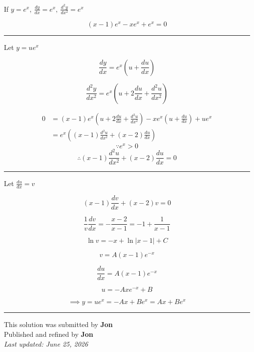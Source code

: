 \documentclass[12pt]{article}
\begin{document}
\newcommand{\ds}{\displaystyle}

If $\ds y=e^x,\ \frac{dy}{dx}=e^x,\  \frac{d^2y}{dx^2}=e^x$

$$(x-1)e^x-xe^x+e^x=0$$

\bigskip\hrule\bigskip

Let $\ds y=ue^x$

$$\frac{dy}{dx}=e^x\left(u+\frac{du}{dx}\right)$$

$$\frac{d^2y}{dx^2}=e^x\left(u+2\frac{du}{dx}+\frac{d^2u}{dx^2}\right)$$

\begin{align*}
0&=(x-1)e^x\left(u+2\frac{du}{dx}+\frac{d^2u}{dx^2}\right)
-xe^x\left(u+\frac{du}{dx}\right)+ue^x\\
&=e^x\left((x-1)\frac{d^2u}{dx^2}+(x-2)\frac{du}{dx}\right)
\end{align*}
$$\because e^x>0$$
$$\therefore (x-1)\frac{d^2u}{dx^2}+(x-2)\frac{du}{dx}=0$$

\bigskip\hrule\bigskip

Let $\ds \frac{du}{dx}=v$

$$(x-1)\frac{dv}{dx}+(x-2)v=0$$

$$\frac1v\frac{dv}{dx}=-\frac{x-2}{x-1}=-1+\frac1{x-1}$$

$$\ln v=-x+\ln|x-1|+C$$

$$v=A(x-1)e^{-x}$$

$$\frac{du}{dx}=A(x-1)e^{-x}$$

$$u=-Axe^{-x}+B$$

$$\implies y=ue^x=-Ax+Be^x=Ax+Be^x$$


\bigskip
\hrule
\begin{center}
    This solution was submitted by \textbf{Jon}\\[4pt]
    Published and refined by \textbf{Jon}\\[8pt]
    \textit{Last updated: June 25, 2026}
\end{center}
\end{document}

